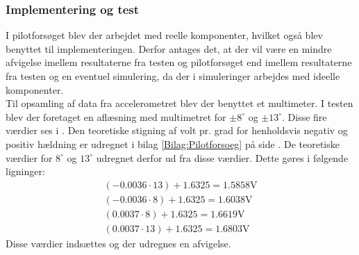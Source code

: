 \subsubsection{Implementering og test}
I pilotforsøget blev der arbejdet med reelle komponenter, hvilket også blev benyttet til implementeringen. Derfor antages det, at der vil være en mindre afvigelse imellem resultaterne fra testen og pilotforsøget end imellem resultaterne fra testen og en eventuel simulering, da der i simuleringer arbejdes med ideelle komponenter.\\
Til opsamling af data fra accelerometret blev der benyttet et multimeter. I testen blev der foretaget en aflæsning med multimetret for $\pm8^\circ$ og $\pm13^\circ$. Disse fire værdier ses i . Den teoretiske stigning af volt pr. grad for henholdsvis negativ og positiv hældning er udregnet i bilag \ref{Bilag:Pilotforsoeg} på side \pageref{Bilag:Pilotforsoeg}. De teoretiske værdier for $8^\circ$ og $13^\circ$ udregnet derfor ud fra disse værdier. Dette gøres i følgende ligninger:
\begin{align}
(-0.0036 \cdot 13) + 1.6325 = 1.5858\text{V} \\
(-0.0036 \cdot 8) + 1.6325 = 1.6038\text{V}  \\
(0.0037 \cdot 8) + 1.6325 = 1.6619\text{V}  \\
(0.0037 \cdot 13) + 1.6325 = 1.6803\text{V}
\end{align}
Disse værdier indsættes og der udregnes en afvigelse.
